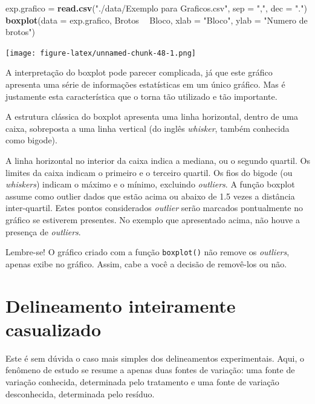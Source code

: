 \documentclass[
]{article}
\newenvironment{Shaded}{\begin{snugshade}}{\end{snugshade}}
\newcommand{\DataTypeTok}[1]{\textcolor[rgb]{0.13,0.29,0.53}{#1}}
\newcommand{\KeywordTok}[1]{\textcolor[rgb]{0.13,0.29,0.53}{\textbf{#1}}}
\newcommand{\NormalTok}[1]{#1}
\newcommand{\OperatorTok}[1]{\textcolor[rgb]{0.81,0.36,0.00}{\textbf{#1}}}
\newcommand{\StringTok}[1]{\textcolor[rgb]{0.31,0.60,0.02}{#1}}
\begin{document}
\begin{Shaded}
\begin{Highlighting}[]
\NormalTok{exp.grafico =}\StringTok{ }\KeywordTok{read.csv}\NormalTok{(}\StringTok{"./data/Exemplo para Graficos.csv"}\NormalTok{, }\DataTypeTok{sep =} \StringTok{","}\NormalTok{, }\DataTypeTok{dec =} \StringTok{"."}\NormalTok{)}
\KeywordTok{boxplot}\NormalTok{(}\DataTypeTok{data =}\NormalTok{ exp.grafico, Brotos }\OperatorTok{~}\StringTok{ }\NormalTok{Bloco, }
        \DataTypeTok{xlab =} \StringTok{"Bloco"}\NormalTok{, }
        \DataTypeTok{ylab =} \StringTok{"Numero de brotos"}\NormalTok{)}
\end{Highlighting}
\end{Shaded}

\texttt{[image: figure-latex/unnamed-chunk-48-1.png]}

A interpretação do boxplot pode parecer complicada, já que este gráfico apresenta uma série de informações estatísticas em um único gráfico. Mas é justamente esta característica que o torna tão utilizado e tão importante.

A estrutura clássica do boxplot apresenta uma linha horizontal, dentro de uma caixa, sobreposta a uma linha vertical (do inglês \emph{whisker}, também conhecida como bigode).

A linha horizontal no interior da caixa indica a mediana, ou o segundo quartil. Os limites da caixa indicam o primeiro e o terceiro quartil. Os fios do bigode (ou \emph{whiskers}) indicam o máximo e o mínimo, excluindo \emph{outliers}. A função boxplot assume como outlier dados que estão acima ou abaixo de 1.5 vezes a distância inter-quartil. Estes pontos considerados \emph{outlier} serão marcados pontualmente no gráfico se estiverem presentes. No exemplo que apresentado acima, não houve a presença de \emph{outliers}.

Lembre-se! O gráfico criado com a função \texttt{boxplot()} não remove os \emph{outliers}, apenas exibe no gráfico. Assim, cabe a você a decisão de removê-los ou não.

\hypertarget{delineamento-inteiramente-casualizado}{%
\section{Delineamento inteiramente casualizado}\label{delineamento-inteiramente-casualizado}}

Este é sem dúvida o caso mais simples dos delineamentos experimentais. Aqui, o fenômeno de estudo se resume a apenas duas fontes de variação: uma fonte de variação conhecida, determinada pelo tratamento e uma fonte de variação desconhecida, determinada pelo resíduo.
\end{document}
